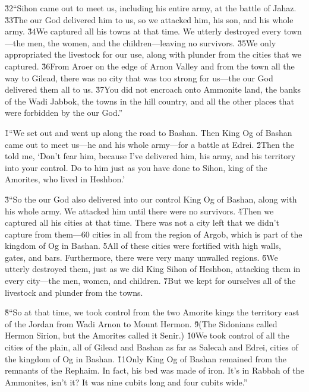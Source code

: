 \v{32}``Sihon came out to meet us, including his entire army, at the battle of Jahaz. \v{33}The  our God delivered him to us, so we attacked him, his son, and his whole army. \v{34}We captured all his towns at that time. We utterly destroyed every town---the men, the women, and the children---leaving no survivors. \v{35}We only appropriated the livestock for our use, along with plunder from the cities that we captured. \v{36}From Aroer on the edge of Arnon Valley and from the town all the way to Gilead, there was no city that was too strong for us---the  our God delivered them all to us. \v{37}You did not encroach onto Ammonite land, the banks of the Wadi Jabbok, the towns in the hill country, and all the other places that were forbidden by the  our God.''

\v{1}``We set out and went up along the road to Bashan. Then King Og of Bashan came out to meet us---he and his whole army---for a battle at Edrei. \v{2}Then the  told me, `Don't fear him, because I've delivered him, his army, and his territory into your control. Do to him just as you have done to Sihon, king of the Amorites, who lived in Heshbon.'

\v{3}``So the  our God also delivered into our control King Og of Bashan, along with his whole army. We attacked him until there were no survivors. \v{4}Then we captured all his cities at that time. There was not a city left that we didn't capture from them---60 cities in all from the region of Argob, which is part of the kingdom of Og in Bashan. \v{5}All of these cities were fortified with high walls, gates, and bars. Furthermore, there were very many unwalled regions. \v{6}We utterly destroyed them, just as we did King Sihon of Heshbon, attacking them in every city---the men, women, and children. \v{7}But we kept for ourselves all of the livestock and plunder from the towns.

\v{8}``So at that time, we took control from the two Amorite kings the territory east of the Jordan from Wadi Arnon to Mount Hermon. \v{9}(The Sidonians called Hermon Sirion, but the Amorites called it Senir.) \v{10}We took control of all the cities of the plain, all of Gilead and Bashan as far as Salecah and Edrei, cities of the kingdom of Og in Bashan. \v{11}Only King Og of Bashan remained from the remnants of the Rephaim. In fact, his bed was made of iron. It's in Rabbah of the Ammonites, isn't it? It was nine cubits long and four cubits wide.''

